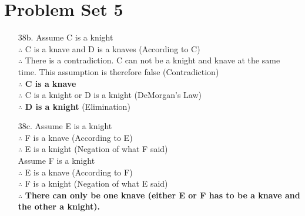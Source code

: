 \documentclass[12pt]{article}
\begin{document}
\section*{Problem Set 5}
\begin{itemize}
    \item [38b.]
        Assume C is a knight \\
        $\therefore$ C is a knave and D is a knaves (According to C) \\
        $\therefore$ There is a contradiction. C can not be a knight and knave
                     at the same time. This assumption is therefore false (Contradiction)\\
        $\therefore$ {\bf C is a knave} \\
        $\therefore$ C is a knight or D is a knight (DeMorgan's Law) \\
        $\therefore$ {\bf D is a knight} (Elimination)
    
    \item [38c.]
        Assume E is a knight \\
        $\therefore$ F is a knave (According to E) \\
        $\therefore$ E is a knight (Negation of what F said) \\
        \newline
        Assume F is a knight \\
        $\therefore$ E is a knave (According to F) \\
        $\therefore$ F is a knight (Negation of what E said) \\
        \newline
        $\therefore$ {\bf There can only be one knave (either E or F has to be a knave
                     and the other a knight).}
\end{itemize}
\end{document}
